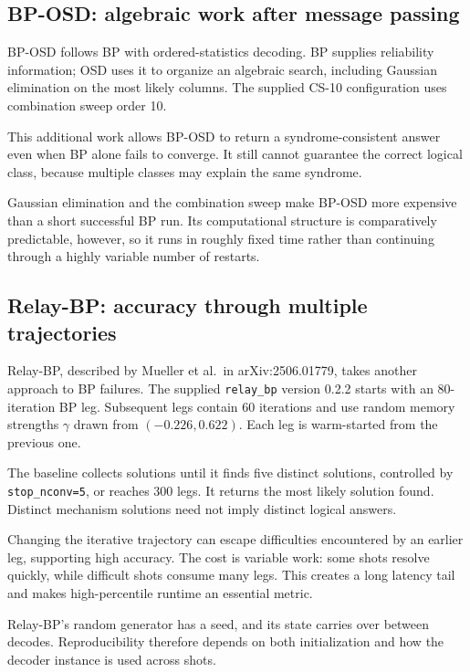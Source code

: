 \subsection{BP-OSD: algebraic work after message passing}

BP-OSD follows BP with ordered-statistics decoding. BP supplies reliability information; OSD uses it to organize an algebraic search, including Gaussian elimination on the most likely columns. The supplied CS-10 configuration uses combination sweep order 10.

This additional work allows BP-OSD to return a syndrome-consistent answer even when BP alone fails to converge. It still cannot guarantee the correct logical class, because multiple classes may explain the same syndrome.

Gaussian elimination and the combination sweep make BP-OSD more expensive than a short successful BP run. Its computational structure is comparatively predictable, however, so it runs in roughly fixed time rather than continuing through a highly variable number of restarts.

\subsection{Relay-BP: accuracy through multiple trajectories}

Relay-BP, described by Mueller et al.\ in arXiv:2506.01779, takes another approach to BP failures. The supplied \texttt{relay\_bp} version 0.2.2 starts with an 80-iteration BP leg. Subsequent legs contain 60 iterations and use random memory strengths $\gamma$ drawn from $(-0.226,0.622)$. Each leg is warm-started from the previous one.

The baseline collects solutions until it finds five distinct solutions, controlled by \texttt{stop\_nconv=5}, or reaches 300 legs. It returns the most likely solution found. Distinct mechanism solutions need not imply distinct logical answers.

Changing the iterative trajectory can escape difficulties encountered by an earlier leg, supporting high accuracy. The cost is variable work: some shots resolve quickly, while difficult shots consume many legs. This creates a long latency tail and makes high-percentile runtime an essential metric.

Relay-BP's random generator has a seed, and its state carries over between decodes. Reproducibility therefore depends on both initialization and how the decoder instance is used across shots.


